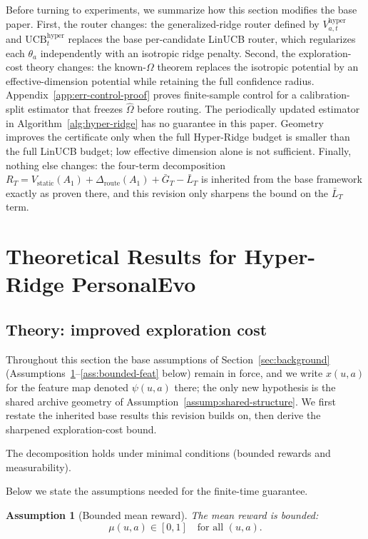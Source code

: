 \documentclass{article} %
\newtheorem{assumption}{Assumption}
\providecommand{\Rstatic}{V_{\mathrm{static}}}
\providecommand{\Droute}{\Delta_{\mathrm{route}}}
\begin{document}
Before turning to experiments, we summarize how this section modifies the base
paper. First, the router changes: the generalized-ridge router defined by
$V_{a,t}^{\mathrm{hyper}}$ and $\mathrm{UCB}_t^{\mathrm{hyper}}$ replaces the
base per-candidate LinUCB router, which regularizes each $\theta_a$
independently with an isotropic ridge penalty. Second, the exploration-cost
theory changes: the known-$\Omega$ theorem replaces the isotropic potential by
an effective-dimension potential while retaining the full confidence radius.
Appendix~\ref{app:err-control-proof} proves finite-sample control for a
calibration-split estimator that freezes $\widehat{\Omega}$ before routing.
The periodically updated estimator in Algorithm~\ref{alg:hyper-ridge} has no
guarantee in this paper. Geometry improves the certificate only when the full
Hyper-Ridge budget is smaller than the full LinUCB budget; low effective
dimension alone is not sufficient. Finally, nothing else changes: the
four-term decomposition
$R_T = \Rstatic(A_1) + \Droute(A_1) + \bar{G}_T - \bar{L}_T$ is inherited from
the base framework exactly as proven there, and this revision only sharpens
the bound on the $\bar{L}_T$ term.

\section{Theoretical Results for Hyper-Ridge PersonalEvo}
\label{sec:hyper-theory}



\subsection{Theory: improved exploration cost}

\label{sec:method-assump}

Throughout this section the base assumptions of Section~\ref{sec:background} (Assumptions~\ref{ass:bounded}--\ref{ass:bounded-feat} below) remain in force, and we write $x(u,a)$ for the feature map denoted $\psi(u,a)$ there; the only new hypothesis is the shared archive geometry of Assumption~\ref{assump:shared-structure}. We first restate the inherited base results this revision builds on, then derive the sharpened exploration-cost bound.

The decomposition holds under minimal conditions (bounded rewards and measurability).

Below we state the assumptions needed for the finite-time guarantee.

\begin{assumption}[Bounded mean reward]
\label{ass:bounded}
The mean reward is bounded:
\begin{equation}
\label{eq:ass-bounded}
\mu(u,a) \in [0,1] \quad \text{for all } (u,a).
\end{equation}
\end{assumption}
\end{document}
